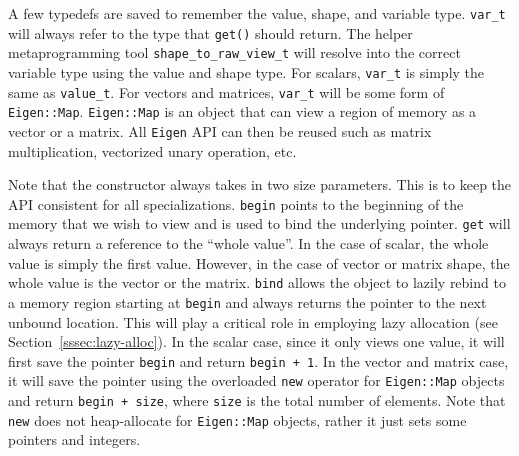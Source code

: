 A few typedefs are saved to remember the value, shape, and variable type.
\verb|var_t| will always refer to the type that \verb|get()| should return.
The helper metaprogramming tool \verb|shape_to_raw_view_t| will resolve into
the correct variable type using the value and shape type.
For scalars, \verb|var_t| is simply the same as \verb|value_t|.
For vectors and matrices, \verb|var_t| will be some form of \verb|Eigen::Map|.
\verb|Eigen::Map| is an object that can view a region of memory as a vector or a matrix.
All \verb|Eigen| API can then be reused such as 
matrix multiplication, vectorized unary operation, etc.

Note that the constructor always takes in two size parameters.
This is to keep the API consistent for all specializations.
\verb|begin| points to the beginning of the memory that we wish to view
and is used to bind the underlying pointer.
\verb|get| will always return a reference to the ``whole value''.
In the case of scalar, the whole value is simply the first value.
However, in the case of vector or matrix shape, the whole value is the vector or the matrix.
\verb|bind| allows the object to lazily rebind to a memory region
starting at \verb|begin| and always returns the pointer to the next unbound location.
This will play a critical role in employing lazy allocation (see Section~\ref{sssec:lazy-alloc}).
In the scalar case, since it only views one value, 
it will first save the pointer \verb|begin| and return \verb|begin + 1|.
In the vector and matrix case, it will save the pointer 
using the overloaded \verb|new| operator for \verb|Eigen::Map| objects and return \verb|begin + size|,
where \verb|size| is the total number of elements.
Note that \verb|new| does not heap-allocate for \verb|Eigen::Map| objects, 
rather it just sets some pointers and integers.
